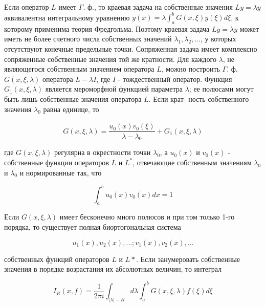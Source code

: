 \documentclass[10pt]{article}
\begin{document}
Если оператор $L$ имеет $\Gamma$. ф., то краевая задача на собственные значения $L y=\lambda y$ әквивалентна интегральному уравнению $y(x)=\lambda \int_{a}^{b} G(x, \xi) y(\xi) d \xi$, к которому применима теория Фредгольма. Поэтому краевая задача $L y=\lambda y$ может иметь не более счетного числа собственных значений $\lambda_{1}, \lambda_{2}, \ldots$, у которых отсутствуют конечные предельные точки. Сопряженная задача имеет комплексно сопряженные собственные значения той же кратности. Для каждого $\lambda$, не являющегося собственным значением оператора $L$, можно построить $\Gamma$. ф. $G(x, \xi, \lambda)$ оператора $L-\lambda I$, где $I$ - тождественный оператор. Функция $G_{1}(x, \xi, \lambda)$ является мероморфной функцией параметра $\lambda$; ее полюсами могут быть лишь собственные значения оператора $L$. Если крат- ность собственного значения $\lambda_{0}$ равна единице, то



\[

G(x, \xi, \lambda)=\frac{u_{0}(x) \overline{v_{0}(\xi)}}{\lambda-\lambda_{0}}+G_{1}(x, \xi, \lambda)

\]



где $G(x, \xi, \lambda)$ регулярна в окрестности точки $\lambda_{0}$, а $u_{0}(x)$ и $v_{0}(x)$ - собственные функции операторов $L$ и $L^{*}$, отвечающие собственным значениям $\lambda_{0}$ и $\overline{\lambda_{0}}$ и нормированные так, что



\[

\int_{a}^{b} u_{0}(x) \overline{v_{0}(x)} d x=1

\]



Если $G(x, \xi, \lambda)$ имеет бесконечно много полюсов и при том только 1-го порядка, то существует полная биортогональная система



\[

u_{1}(x), u_{2}(x), \ldots ; v_{1}(x), v_{2}(x), \ldots

\]



собственных функций операторов $L$ и $L *$. Если занумеровать собственные значения в порядке возрастания их абсолютных величин, то интеграл



\[

I_{R}(x, f)=\frac{1}{2 \pi i} \int_{|\lambda|-R} d \lambda \int_{a}^{b} G(x, \xi, \lambda) f(\xi) d \xi

\]
\end{document}
